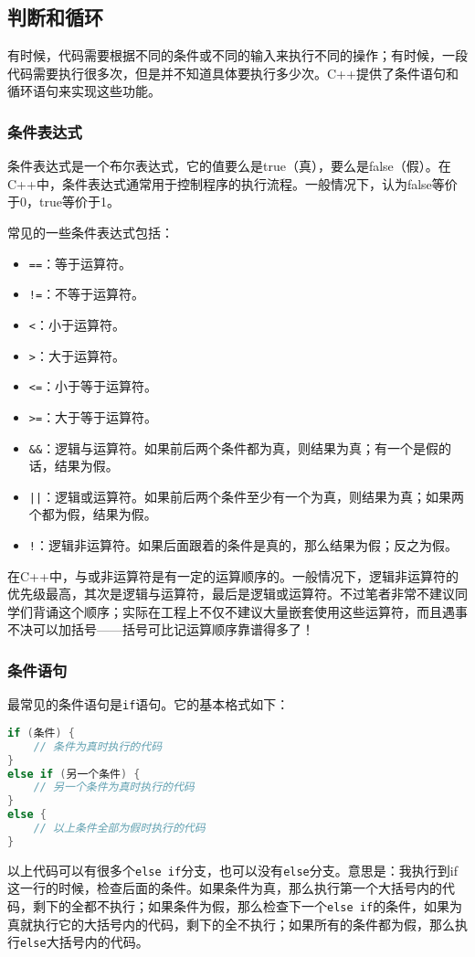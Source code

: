 \documentclass[../main.tex]{subfiles}
\begin{document}
\subsection{判断和循环}
有时候，代码需要根据不同的条件或不同的输入来执行不同的操作；有时候，一段代码需要执行很多次，但是并不知道具体要执行多少次。C++提供了条件语句和循环语句来实现这些功能。

\subsubsection{条件表达式}
条件表达式是一个布尔表达式，它的值要么是true（真），要么是false（假）。在C++中，条件表达式通常用于控制程序的执行流程。一般情况下，认为false等价于0，true等价于1。

常见的一些条件表达式包括：
\begin{itemize}
  \item \texttt{==}：等于运算符。
  \item \texttt{!=}：不等于运算符。
  \item \texttt{<}：小于运算符。
  \item \texttt{>}：大于运算符。
  \item \texttt{<=}：小于等于运算符。
  \item \texttt{>=}：大于等于运算符。
  \item \texttt{\&\&}：逻辑与运算符。如果前后两个条件都为真，则结果为真；有一个是假的话，结果为假。
  \item \texttt{||}：逻辑或运算符。如果前后两个条件至少有一个为真，则结果为真；如果两个都为假，结果为假。
  \item \texttt{!}：逻辑非运算符。如果后面跟着的条件是真的，那么结果为假；反之为假。
\end{itemize}

在C++中，与或非运算符是有一定的运算顺序的。一般情况下，逻辑非运算符的优先级最高，其次是逻辑与运算符，最后是逻辑或运算符。不过笔者非常不建议同学们背诵这个顺序；实际在工程上不仅不建议大量嵌套使用这些运算符，而且遇事不决可以加括号——括号可比记运算顺序靠谱得多了！

\subsubsection{条件语句}

最常见的条件语句是\texttt{if}语句。它的基本格式如下：
\begin{lstlisting}[language=C++]
if (条件) {
    // 条件为真时执行的代码
}
else if (另一个条件) {
    // 另一个条件为真时执行的代码
}
else {
    // 以上条件全部为假时执行的代码
}
\end{lstlisting}
以上代码可以有很多个\texttt{else if}分支，也可以没有\texttt{else}分支。意思是：我执行到if这一行的时候，检查后面的条件。如果条件为真，那么执行第一个大括号内的代码，剩下的全都不执行；如果条件为假，那么检查下一个\texttt{else if}的条件，如果为真就执行它的大括号内的代码，剩下的全不执行；如果所有的条件都为假，那么执行\texttt{else}大括号内的代码。
\end{document}
